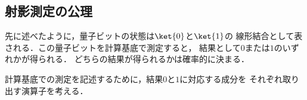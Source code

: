 \subsection{射影測定の公理}

先に述べたように，量子ビットの状態は$\ket{0}$と$\ket{1}$の
線形結合として表される．この量子ビットを計算基底で測定すると，
結果として$0$または$1$のいずれかが得られる．
どちらの結果が得られるかは確率的に決まる．

計算基底での測定を記述するために，結果$0$と$1$に対応する成分を
それぞれ取り出す演算子を考える．





